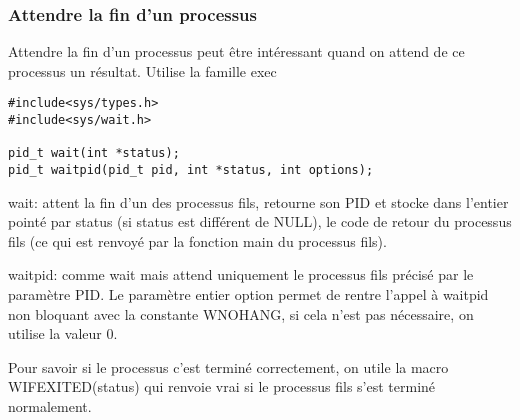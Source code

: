 \documentclass[a4paper]{article}
\begin{document}
\subsubsection{Attendre la fin d'un processus}
Attendre la fin d'un processus peut être intéressant quand on attend de ce processus un résultat.\newline
Utilise la famille exec\newline
\begin{lstlisting}
#include<sys/types.h>
#include<sys/wait.h>

pid_t wait(int *status);
pid_t waitpid(pid_t pid, int *status, int options);
\end{lstlisting}
wait: attent la fin d'un des processus fils, retourne son PID et stocke dans l'entier pointé par status (si status est différent de NULL), le code de retour du processus fils (ce qui est renvoyé par la  fonction main du processus fils).\par{}
waitpid: comme wait mais attend uniquement le processus fils précisé par le paramètre PID.  Le paramètre entier \guillemotleft{}option\guillemotright{} permet de rentre l’appel à waitpid non bloquant avec la constante WNOHANG, si cela n’est pas nécessaire, on utilise la valeur 0.
\par{}
Pour savoir si le processus c'est terminé correctement, on utile la macro WIFEXITED(status) qui renvoie vrai si le processus fils s’est terminé normalement.\newline
\end{document}
